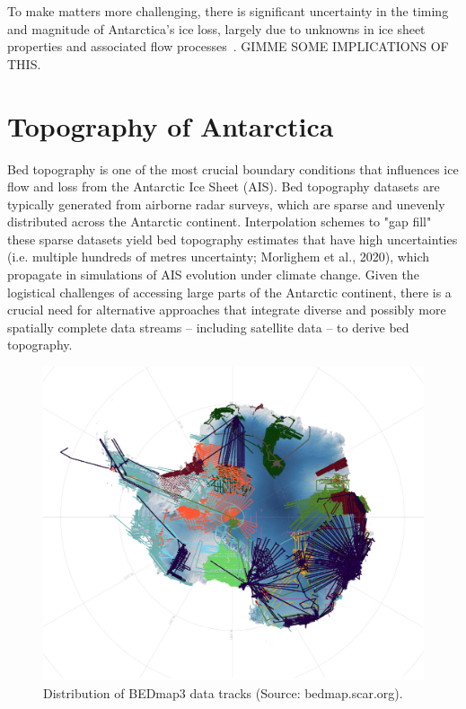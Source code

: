 To make matters more challenging, there is significant uncertainty in the timing and magnitude of Antarctica's ice loss, largely due to unknowns in ice sheet properties and associated flow processes~\cite{IPCC}. GIMME SOME IMPLICATIONS OF THIS.

\chapter*{Topography of Antarctica}\label{review}

Bed topography is one of the most crucial boundary conditions that influences ice flow and loss from the Antarctic Ice Sheet (AIS)\cite{Morlighem_2020}. Bed topography datasets are typically generated from airborne radar surveys, which are sparse and unevenly distributed across the Antarctic continent. Interpolation schemes to "gap fill" these sparse datasets yield bed topography estimates that have high uncertainties (i.e. multiple hundreds of metres uncertainty; Morlighem et al., 2020), which propagate in simulations of AIS evolution under climate change\cite{Castleman_2022}. Given the logistical challenges of accessing large parts of the Antarctic continent, there is a crucial need for alternative approaches that integrate diverse and possibly more spatially complete data streams – including satellite data – to derive bed topography.
\begin{figure}[H]    %
    \includegraphics[scale=0.4]{BEDmap3.png}
    \caption{Distribution of BEDmap3 data tracks (Source: bedmap.scar.org).}
\end{figure}

